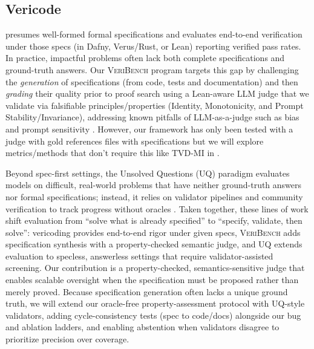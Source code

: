 \documentclass{article}
\begin{document}
\subsection{Vericode}
\citet{bursuc2025benchmarkvericodingformallyverified} presumes well-formed formal specifications and evaluates end-to-end verification under those specs (in Dafny, Verus/Rust, or Lean) reporting verified pass rates.
In practice, impactful problems often lack both complete specifications and ground-truth answers.
Our \textsc{VeriBench} program targets this gap by challenging the \emph{generation} of specifications (from code, tests and documentation) and then \emph{grading} their quality prior to proof search using a Lean-aware LLM judge that we validate via falsifiable principles/properties (Identity, Monotonicity, and Prompt Stability/Invariance), addressing known pitfalls of LLM-as-a-judge such as bias and prompt sensitivity \citep{Zheng2023MTBench,Kocmi2024HumanVsLLM,Li2024TrustLLMJudgments}.
However, our framework has only been tested with a judge with gold references files with specifications but we will explore metrics/methods that don't require this like TVD-MI in \citep{robertson2025stepbystep}.

Beyond spec-first settings, the Unsolved Questions (UQ) paradigm evaluates models on difficult, real-world problems that have neither ground-truth answers nor formal specifications; instead, it relies on validator pipelines and community verification to track progress without oracles \cite{nie2025uqassessinglanguagemodels}.
Taken together, these lines of work shift evaluation from “solve what is already specified” to “specify, validate, then solve”:
vericoding provides end-to-end rigor under given specs, \textsc{VeriBench} adds specification synthesis with a property-checked semantic judge, and UQ extends evaluation to specless, answerless settings that require validator-assisted screening.
Our contribution is a property-checked, semantics-sensitive judge that enables scalable oversight when the specification must be proposed rather than merely proved.
Because specification generation often lacks a unique ground truth, we will extend our oracle-free property-assessment protocol with UQ-style validators, adding cycle-consistency tests (spec to code/docs) alongside our bug and ablation ladders, and enabling abstention when validators disagree to prioritize precision over coverage.
\end{document}
